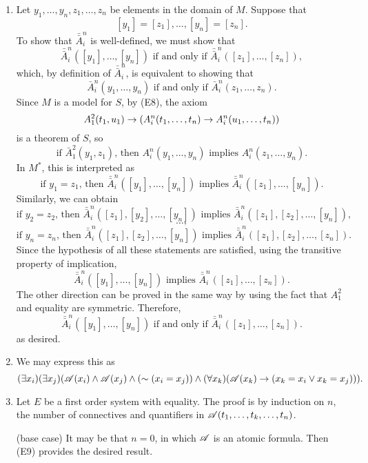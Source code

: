 \begin{enumerate}
  \item %
    Let \(y_1, \dots, y_n, z_1, \dots, z_n\) be elements in the domain of \(M\). Suppose that
    \[[y_1] = [z_1], \dots, [y_n] = [z_n].\]
    To show that \(\bar{\bar{A}}^n_i\) is well-defined, we must show that
    \[\bar{\bar{A}}^n_i([y_1], \dots, [y_n]) \text{ if and only if } \bar{\bar{A}}^n_i([z_1], \dots, [z_n]),\]
    which, by definition of \(\bar{\bar{A}}^n_i\), is equivalent to showing that
    \[\bar{A}^n_i(y_1, \dots, y_n) \text{ if and only if } \bar{A}^n_i(z_1, \dots, z_n).\]
    Since \(M\) is a model for \(S\), by (E8), the axiom
    \[A^2_1(t_1, u_1) \rightarrow (A^n_i(t_1, \dots, t_n) \rightarrow A^n_i(u_1, \dots, t_n))\]
    is a theorem of \(S\), so
    \[\text{if } \bar{A}^2_1(y_1, z_1) \text{, then } A^n_i(y_1, \dots, y_n) \text{ implies } A^n_i(z_1, \dots, y_n).\]
    In \(M^*\), this is interpreted as
    \[\text{if } y_1 = z_1 \text{, then } \bar{\bar{A}}^n_i([y_1], \dots, [y_n]) \text{ implies } \bar{\bar{A}}^n_i([z_1], \dots, [y_n]).\]
    Similarly, we can obtain
    \[\text{if } y_2 = z_2 \text{, then } \bar{\bar{A}}^n_i([z_1], [y_2], \dots, [y_n]) \text{ implies } \bar{\bar{A}}^n_i([z_1], [z_2], \dots, [y_n]),\]
    \[\dots,\]
    \[\text{if } y_n = z_n \text{, then } \bar{\bar{A}}^n_i([z_1], [z_2], \dots, [y_n]) \text{ implies } \bar{\bar{A}}^n_i([z_1], [z_2], \dots, [z_n]).\]
    Since the hypothesis of all these statements are satisfied, using the transitive property of implication,
    \[\bar{\bar{A}}^n_i([y_1], \dots, [y_n]) \text{ implies } \bar{\bar{A}}^n_i([z_1], \dots, [z_n]).\]
    The other direction can be proved in the same way by using the fact that \(A^2_1\) and equality are symmetric. Therefore,
    \[\bar{\bar{A}}^n_i([y_1], \dots, [y_n]) \text{ if and only if } \bar{\bar{A}}^n_i([z_1], \dots, [z_n]).\]
    as desired.

  \item %
    We may express this as
    \[(\exists x_i)(\exists x_j)(\mathscr{A}(x_i) \land \mathscr{A}(x_j) \land (\sim(x_i = x_j)) \land (\forall x_k)(\mathscr{A}(x_k) \rightarrow (x_k = x_i \lor x_k = x_j))).\]

  \item %
    Let \(E\) be a first order system with equality. The proof is by induction on \(n\), the number of connectives and quantifiers in \(\mathscr{A}(t_1, \dots, t_k, \dots, t_n)\).

    (base case) It may be that \(n = 0\), in which \(\mathscr{A}\) is an atomic formula. Then (E9) provides the desired result.


\end{enumerate}

